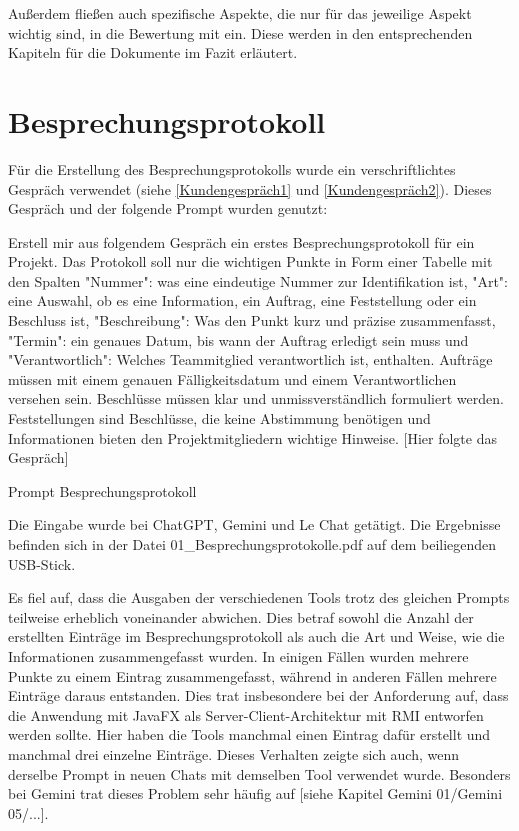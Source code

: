 Außerdem fließen auch spezifische Aspekte, die nur für das jeweilige Aspekt wichtig sind, in die Bewertung mit ein. 
Diese werden in den entsprechenden Kapiteln für die Dokumente im Fazit erläutert.


\section{Besprechungsprotokoll}  \label{CompBesprechungsprotokoll}

Für die Erstellung des Besprechungsprotokolls wurde ein verschriftlichtes Gespräch verwendet 
(siehe \autoref{Kundengespräch1} und \autoref{Kundengespräch2}). Dieses Gespräch und der folgende Prompt wurden 
genutzt:

\begin{prompt}[H]
    \begin{tcolorbox}[colback=gray!20, colframe=gray!20, boxrule=0pt, sharp corners] 
        Erstell mir aus folgendem Gespräch ein erstes Besprechungsprotokoll für ein Projekt. Das Protokoll soll nur 
        die wichtigen Punkte in Form einer Tabelle mit den Spalten "Nummer": was eine eindeutige Nummer zur 
        Identifikation ist, "Art": eine Auswahl, ob es eine Information, ein Auftrag, eine Feststellung oder ein 
        Beschluss ist, "Beschreibung": Was den Punkt kurz und präzise zusammenfasst, "Termin": ein genaues Datum, bis 
        wann der Auftrag erledigt sein muss und "Verantwortlich": Welches Teammitglied verantwortlich ist, enthalten. 
        Aufträge müssen mit einem genauen Fälligkeitsdatum und einem Verantwortlichen versehen sein. Beschlüsse 
        müssen klar und unmissverständlich formuliert werden. Feststellungen sind Beschlüsse, die keine Abstimmung 
        benötigen und Informationen bieten den Projektmitgliedern wichtige Hinweise. 
        [Hier folgte das Gespräch]
        \vfill
    \end{tcolorbox}
    \caption{Prompt Besprechungsprotokoll}
    \label{Prompt Besprechungsprotokoll}
\end{prompt}

Die Eingabe wurde bei ChatGPT, Gemini und Le Chat getätigt. Die Ergebnisse befinden sich in der Datei 
01\_Besprechungsprotokolle.pdf auf dem beiliegenden USB-Stick.

Es fiel auf, dass die Ausgaben der verschiedenen Tools trotz des gleichen Prompts teilweise erheblich voneinander 
abwichen. Dies betraf sowohl die Anzahl der erstellten Einträge im Besprechungsprotokoll als auch die Art und 
Weise, wie die Informationen zusammengefasst wurden. In einigen Fällen wurden mehrere Punkte zu einem Eintrag 
zusammengefasst, während in anderen Fällen mehrere Einträge daraus entstanden. Dies trat insbesondere bei der 
Anforderung auf, dass die Anwendung mit JavaFX als Server-Client-Architektur mit RMI entworfen werden sollte. 
Hier haben die Tools manchmal einen Eintrag dafür erstellt und manchmal drei einzelne Einträge. Dieses Verhalten 
zeigte sich auch, wenn derselbe Prompt in neuen Chats mit demselben Tool verwendet wurde. Besonders bei Gemini trat 
dieses Problem sehr häufig auf [siehe Kapitel Gemini 01/Gemini 05/...].


